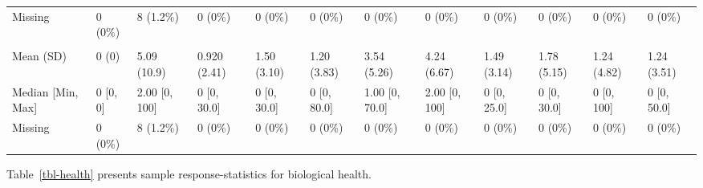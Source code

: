 \documentclass[
  single column]{article}
\begin{document}
\begin{landscape}
\begin{longtable}[t]{llllllllllll}
\hspace{1em}Missing & 0 (0\%) & 8 (1.2\%) & 0 (0\%) & 0 (0\%) & 0 (0\%) & 0 (0\%) & 0 (0\%) & 0 (0\%) & 0 (0\%) & 0 (0\%) & 0 \vphantom{1} (0\%)\\
\addlinespace[0.3em]
\multicolumn{12}{l}{\textbf{Weekly Scripture}}\\
\hspace{1em}Mean (SD) & 0 (0) & 5.09 (10.9) & 0.920 (2.41) & 1.50 (3.10) & 1.20 (3.83) & 3.54 (5.26) & 4.24 (6.67) & 1.49 (3.14) & 1.78 (5.15) & 1.24 (4.82) & 1.24 (3.51)\\
\hspace{1em}Median [Min, Max] & 0 [0, 0] & 2.00 [0, 100] & 0 [0, 30.0] & 0 [0, 30.0] & 0 [0, 80.0] & 1.00 [0, 70.0] & 2.00 [0, 100] & 0 [0, 25.0] & 0 [0, 30.0] & 0 [0, 100] & 0 [0, 50.0]\\
\hspace{1em}Missing & 0 (0\%) & 8 (1.2\%) & 0 (0\%) & 0 (0\%) & 0 (0\%) & 0 (0\%) & 0 (0\%) & 0 (0\%) & 0 (0\%) & 0 (0\%) & 0 (0\%)\\*

\end{longtable}

\endgroup{}


\end{landscape}

\newpage{}

Table~\ref{tbl-health} presents sample response-statistics for
biological health.
\end{document}
